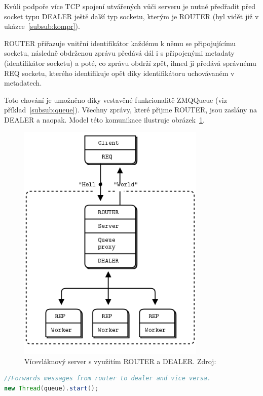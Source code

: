 \documentclass[thesis=M,czech]{FITthesis}[2014/05/07]
\begin{document}
Kvůli podpoře více TCP spojení utvářených vůči serveru je nutné předřadit před socket typu DEALER ještě další typ socketu, kterým je ROUTER (byl vidět již v ukázce~\ref{subsub:kompr}). 

ROUTER přiřazuje vnitřní identifikátor každému k němu se připojujícímu socketu, následně obdrženou zprávu předává dál i s připojenými metadaty (identifikátor socketu) a poté, co zprávu obdrží zpět, ihned ji předává správnému REQ socketu, kterého identifikuje opět díky identifikátoru uchovávaném v metadatech.

Toto chování je umožněno díky vestavěné funkcionalitě ZMQQueue (viz příklad~\ref{subsub:queue}). Všechny zprávy, které přijme ROUTER, jsou zaslány na DEALER a naopak. Model této komunikace ilustruje obrázek~\ref{fig:mtserver}.

\begin{figure}\centering
	\includegraphics[width=0.8\textwidth]{obr/multithreadingServer.png}
 	\caption[Vícevláknový server s využitím ROUTER a DEALER.]{Vícevláknový server s využitím ROUTER a DEALER. Zdroj: \cite{mtserver}}\label{fig:mtserver}
\end{figure}	

\begin{lstlisting}[language=java]
//Forwards messages from router to dealer and vice versa.
new Thread(queue).start();
\end{lstlisting}
\end{document}
